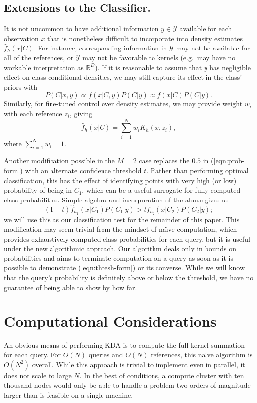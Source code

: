 \documentclass[twoside,leqno,twocolumn]{article}
\begin{document}
\subsection{Extensions to the Classifier.}
It is not uncommon to have additional information $y \in \mathcal{Y}$
available for each observation $x$ that is nonetheless difficult to
incorporate into density estimates $\widehat{f}_h(x|C)$.  For
instance, corresponding information in $\mathcal{Y}$ may not be
available for all of the references, or $\mathcal{Y}$ may not be
favorable to kernels (e.g.~may have no workable interpretation as
$\mathbb{R}^D$).  If it is reasonable to assume that $y$ has
negligible effect on class-conditional densities, we may still capture
its effect in the class' priors with
\begin{equation}
  P(C|x,y) \propto f(x|C,y)P(C|y) \approx f(x|C)P(C|y) .
\end{equation}
Similarly, for fine-tuned control over density estimates, we may
provide weight $w_i$ with each reference $z_i$, giving
\begin{equation}
  \widehat{f}_h(x|C) = \sum_{i=1}^N w_i K_h(x,z_i) ,
\end{equation}
where $\sum_{i=1}^N w_i = 1$.

Another modification possible in the $M = 2$ case replaces the $0.5$
in (\ref{eqn:prob-form}) with an alternate confidence threshold $t$.
Rather than performing optimal classification, this has the effect of
identifying points with very high (or low) probability of being in
$C_1$, which can be a useful surrogate for fully computed class
probabilities.  Simple algebra and incorporation of the above gives us
\begin{equation}\label{eqn:thresh-form}
  (1 - t)\widehat{f}_{h_1}(x|C_1)P(C_1|y) > t\widehat{f}_{h_2}(x|C_2)P(C_2|y) ;
\end{equation}
we will use this as our classification test for the remainder of this
paper.  This modification may seem trivial from the mindset of
na\"{\i}ve computation, which provides exhaustively computed class
probabilities for each query, but it is useful under the new
algorithmic approach.  Our algorithm deals only in bounds on
probabilities and aims to terminate computation on a query as soon as
it is possible to demonstrate (\ref{eqn:thresh-form}) or its converse.
While we will know that the query's probability is definitely above or
below the threshold, we have no guarantee of being able to show by how
far.

\section{Computational Considerations}
An obvious means of performing KDA is to compute the full kernel
summation for each query.  For $O(N)$ queries and $O(N)$ references,
this na\"{\i}ve algorithm is $O(N^2)$ overall.  While this approach is
trivial to implement even in parallel, it does not scale to large $N$.
In the best of conditions, a compute cluster with ten thousand nodes
would only be able to handle a problem two orders of magnitude larger
than is feasible on a single machine.
\end{document}

